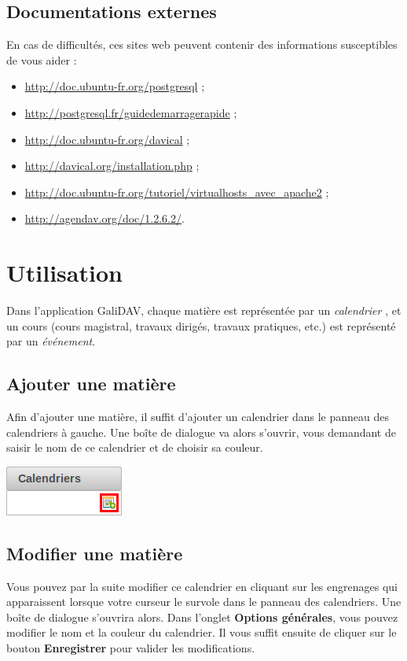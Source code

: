 \documentclass[a4paper, 11pt]{report}
\begin{document}
		\section{Documentations externes}
			En cas de difficultés, ces sites web peuvent contenir des informations susceptibles de vous aider :
			\begin{itemize}
				\item \url{http://doc.ubuntu-fr.org/postgresql} ;
				\item \url{http://postgresql.fr/guidedemarragerapide} ;
				\item \url{http://doc.ubuntu-fr.org/davical} ;
				\item \url{http://davical.org/installation.php} ;
				\item \url{http://doc.ubuntu-fr.org/tutoriel/virtualhosts_avec_apache2} ;
				\item \url{http://agendav.org/doc/1.2.6.2/}.
			\end{itemize}

	\chapter{Utilisation}
		Dans l’application GaliDAV, chaque matière est représentée par un \emph{calendrier} , et un cours (cours magistral, travaux dirigés, travaux pratiques, etc.) est représenté par un \emph{événement}.
		\section{Ajouter une matière}
			Afin d’ajouter une matière, il suffit d’ajouter un calendrier dans le panneau des calendriers à gauche. Une boîte de dialogue va alors s’ouvrir, vous demandant de saisir le nom de ce calendrier et de choisir sa couleur.

			\begin{center}
				\includegraphics[scale = 1]{ajouter_calendrier.png}
			\end{center}
		\section{Modifier une matière}
			Vous pouvez par la suite modifier ce calendrier en cliquant sur les engrenages qui apparaissent lorsque votre curseur le survole dans le panneau des calendriers. Une boîte de dialogue s’ouvrira alors. Dans l’onglet \textbf{Options générales}, vous pouvez modifier le nom et la couleur du calendrier. Il vous suffit ensuite de cliquer sur le bouton \textbf{Enregistrer} pour valider les modifications.
\end{document}

